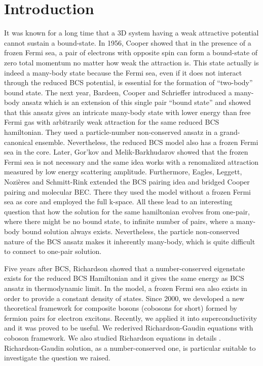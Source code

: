 \documentclass[aps,prb,showpacs,3p,twocolumn]{elsarticle}
\begin{document}
\section{Introduction}
It was known for a long time that a 3D system having a weak attractive potential cannot sustain a bound-state.  In 1956, Cooper showed that in the presence of a frozen Fermi sea, a pair of electrons with opposite spin can form a bound-state of zero total momentum  no matter how weak the attraction is\cite{Cooper}.  This state actually is indeed a many-body state because the  Fermi sea, even if it does not interact through the reduced BCS potential,  is essential for the formation of ``two-body'' bound state.   The next year, Bardeen, Cooper and Schrieffer introduced a many-body ansatz which is an extension of this single pair ``bound state'' and showed that this ansatz gives an intricate many-body state with lower energy than free Fermi gas with arbitrarily weak attraction\cite{BCS} for the same reduced BCS hamiltonian.  They used a particle-number non-conserved ansatz in a grand-canonical ensemble.  Nevertheless, the reduced BCS model also has a frozen Fermi sea in the core. Later,   Gor'kov and Melik-Barkhudarov showed that the frozen Fermi sea is not necessary and the same idea works with a renomalized attraction measured by low energy scattering amplitude\cite{Gorkov}.   Furthermore, Eagles\cite{Eagle}, Leggett\cite{LeggettCrossover}, Nozi\`{e}res and Schmitt-Rink\cite{Nozieres} extended the BCS pairing idea and bridged Cooper pairing and molecular BEC. There they used the model without a frozen Fermi sea as core and employed the full k-space.  All these lead to an interesting question that how the solution for the same hamiltonian evolves from one-pair, where there might be no bound state, to infinite number of pairs, where a many-body bound solution always exists.  Nevertheless, the particle non-conserved nature of the BCS ansatz makes it inherently many-body, which is quite difficult to connect to one-pair solution.  

Five years after BCS, Richardson showed that a number-conserved eigenstate exists for the reduced BCS Hamiltonian and it gives the same energy as BCS ansatz in thermodynamic limit\cite{Richardson1,Richardson2,Richardson3,Richardson1968,gaudin}.  In the model, a frozen Fermi sea also exists in order to provide a constant density of states.  Since 2000, we developed a new theoretical framework for composite bosons (cobosons for short) formed by fermion pairs for electron excitons\cite{CobosonPhysicsReports}.   Recently, we applied it into superconductivity and it was proved to be useful.  We rederived Richardson-Gaudin equations with coboson framework\cite{CobosonBcsRich}. We also studied Richardson equations in details \cite{CombescotCooper,combescotBCS}.  Richardson-Gaudin solution, as a number-conserved one, is  particular suitable to investigate the question we raised.  
\end{document}
